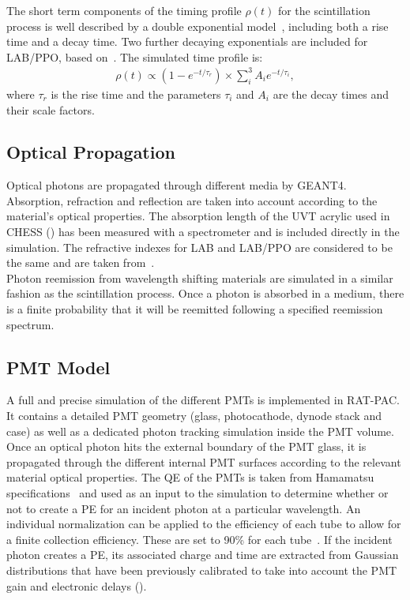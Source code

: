 The short term components of the timing profile $\rho(t)$ for the scintillation process is well described by a double exponential model~\cite{mcguire_palmer}, including both a rise time and a decay time. Two further decaying exponentials are included for LAB/PPO, based on~\cite{labppo}. The simulated time profile is:
\begin{eqnarray}
\rho(t) \propto (1 - e^{-t/\tau_r}) \times \sum^3_i A_i e^{-t/\tau_i},
\end{eqnarray}
where $\tau_r$ is the rise time and the parameters $\tau_i$ and $A_i$ are the decay times and their scale factors.

\subsection{Optical Propagation \label{sec:optics}}

Optical photons are propagated through different media by GEANT4. Absorption, refraction and reflection are taken into account according to the material's optical properties. The absorption length of the UVT acrylic used in CHESS () has been measured with a spectrometer and is included directly in the simulation.  
The refractive indexes for LAB and LAB/PPO are considered to be the same and are taken from~\cite{snop_private}. \\
Photon reemission from wavelength shifting materials are simulated in a similar fashion as the scintillation process. Once a photon is absorbed in a medium, there is a finite probability that it will be reemitted following a specified reemission spectrum.



\subsection{PMT Model \label{sec:pmt_model}}

A full and precise simulation of the different PMTs is implemented in RAT-PAC. It contains a detailed PMT geometry (glass, photocathode, dynode stack and case) as well as a dedicated photon tracking simulation inside the PMT volume. Once an optical photon hits the external boundary of the PMT glass, it is propagated through the different internal PMT surfaces according to the relevant material optical properties.  The QE of the PMTs is taken from Hamamatsu specifications~\cite{h11934} and used as an input to the simulation to determine whether or not to create a PE for an incident photon at a particular wavelength. An individual normalization can be applied to the efficiency of each tube to allow for  
a finite collection efficiency.  These are set to 90\% for each tube~\cite{hamamatsu}.  
If the incident photon creates a PE, its associated charge and time are extracted from Gaussian distributions that have been previously calibrated to take into account the PMT gain and electronic delays ().

